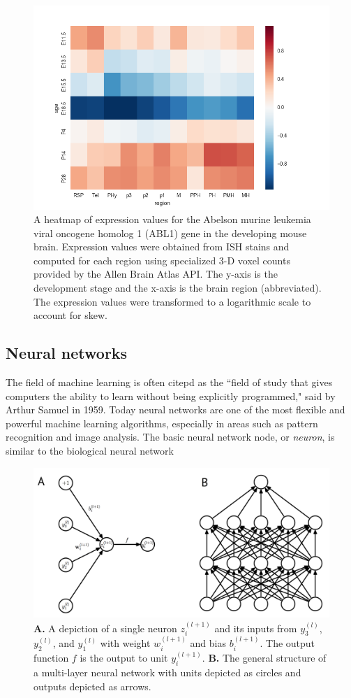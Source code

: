 \documentclass[12pt,oneside,onecolumn,a4paper]{article}
\begin{document}
\begin{figure}[h!]
\begin{center}
\includegraphics[width=0.7\columnwidth]{figures/Abl1/Abl1}
\caption{A heatmap of expression values for the Abelson murine leukemia viral oncogene homolog 1 (ABL1) gene in the developing mouse brain. Expression values were obtained from ISH stains and computed for each region using specialized 3-D voxel counts provided by the Allen Brain Atlas API. The y-axis is the development stage and the x-axis is the brain region (abbreviated). The expression values were transformed to a logarithmic scale to account for skew.%
}
\end{center}
\end{figure}

\subsection{Neural networks}
The field of machine learning is often citepd as the ``field of study that gives computers the ability to learn without being
explicitly programmed," said by Arthur Samuel in 1959. Today neural networks are one of the most flexible and powerful machine learning algorithms, especially in areas such as pattern recognition and image analysis. The basic neural network node, or \textit{neuron}, is similar to the biological neural network

\begin{figure}[h!]
\begin{center}
\includegraphics[width=0.7\columnwidth]{figures/neuralnets/neuralnets}
\caption{\textbf{A.} A depiction of a single neuron $z_i^{(l+1)}$ and its inputs from $y_3^{(l)}$, $y_2^{(l)}$, and $y_1^{(l)}$ with weight $w_i^{(l+1)}$ and bias $b_i^{(l+1)}$. The output function $f$ is the output to unit $y_i^{(l+1)}$. \textbf{B.} The general structure of a multi-layer neural network with units depicted as circles and outputs depicted as arrows. \citep{JMLR:v15:srivastava14a}%
}
\end{center}
\end{figure}
\end{document}
